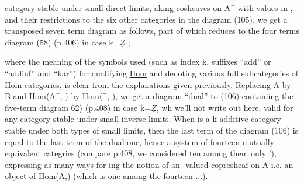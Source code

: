 
category  stable under small direct limits,   aking cosheaves on A\^{}
with values in ,  and their restrictions to the six other categories in
the diagram (105),  we get a transposed seven term diagram as follows,
part of which reduces to the four terms diagram (58) (p.406) in case k=$\underline{Z}$ ;

where the  meaning of the symbols used (such as index k,  suffixes
``add'' or ``addinf'' and ``kar'') for qualifying \uline{Hom}  and denoting various full
subcategories of \uline{Hom}  categories,  is clear from the explanations given
previously.  Replacing A by B and \uline{Hom}\hand{$_!$}(A\^{}, )  by \uline{Hom}\hand{$^!$}(\^{}, ),  we get a
diagram ``dual'' to (106)\hand{,} \hand{(}containing  the  five-term diagram \hand{(}62)
(p.408)  in case k=$\underline{Z}$\hand{)},  wh we'll not write out here,  valid for any 
category  stable under small inverse limits.   When  is a k-additive
category stable under both types of small limits,  then the last term of
the diagram (106)  is equal to the last term of the dual one,  hence
a system of fourteen mutually equivalent categries (compare p.408,  
we considered ten among them only !),  expressing as many ways for 
ing the notion of an -valued copresheaf on A i.e. an object of \uline{Hom}(A,)
(which is one among the fourteen ...).

